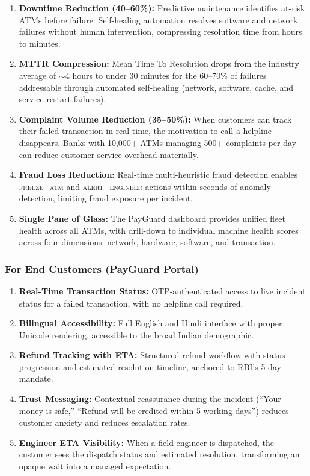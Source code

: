 \documentclass[12pt,a4paper]{article}
\begin{document}
\begin{enumerate}
  \item \textbf{Downtime Reduction (40--60\%):} Predictive maintenance identifies at-risk ATMs
        before failure. Self-healing automation resolves software and network failures without
        human intervention, compressing resolution time from hours to minutes.
  \item \textbf{MTTR Compression:} Mean Time To Resolution drops from the industry average of
        $\sim$4 hours to under 30 minutes for the 60--70\% of failures addressable through
        automated self-healing (network, software, cache, and service-restart failures).
  \item \textbf{Complaint Volume Reduction (35--50\%):} When customers can track their failed
        transaction in real-time, the motivation to call a helpline disappears. Banks with
        10,000+ ATMs managing 500+ complaints per day can reduce customer service overhead
        materially.
  \item \textbf{Fraud Loss Reduction:} Real-time multi-heuristic fraud detection enables
        \textsc{freeze\_atm} and \textsc{alert\_engineer} actions within seconds of anomaly
        detection, limiting fraud exposure per incident.
  \item \textbf{Single Pane of Glass:} The PayGuard dashboard provides unified fleet health
        across all ATMs, with drill-down to individual machine health scores across four
        dimensions: network, hardware, software, and transaction.
\end{enumerate}

\subsubsection{For End Customers (PayGuard Portal)}

\begin{enumerate}
  \item \textbf{Real-Time Transaction Status:} OTP-authenticated access to live incident
        status for a failed transaction, with no helpline call required.
  \item \textbf{Bilingual Accessibility:} Full English and Hindi interface with proper Unicode
        rendering, accessible to the broad Indian demographic.
  \item \textbf{Refund Tracking with ETA:} Structured refund workflow with status progression
        and estimated resolution timeline, anchored to RBI's 5-day mandate.
  \item \textbf{Trust Messaging:} Contextual reassurance during the incident (``Your money
        is safe,'' ``Refund will be credited within 5 working days'') reduces customer anxiety
        and reduces escalation rates.
  \item \textbf{Engineer ETA Visibility:} When a field engineer is dispatched, the customer
        sees the dispatch status and estimated resolution, transforming an opaque wait into
        a managed expectation.
\end{enumerate}
\end{document}
